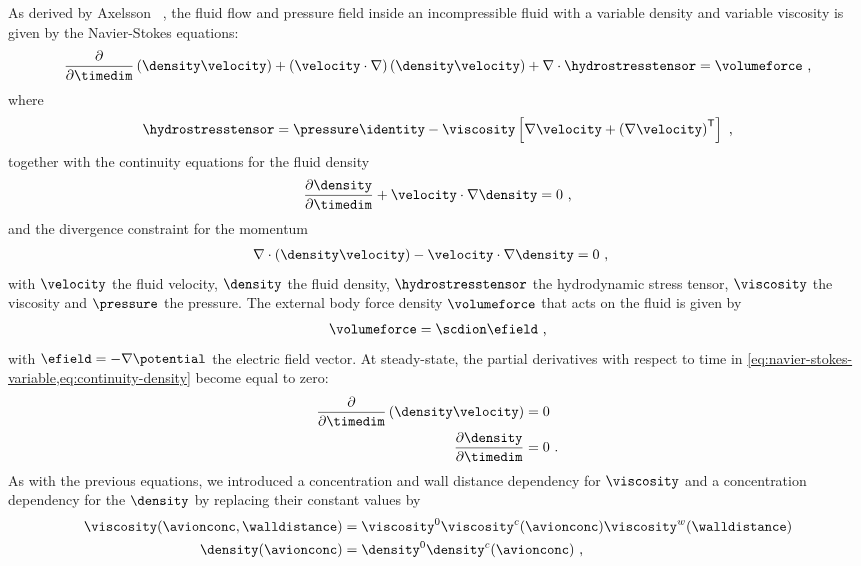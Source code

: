 As derived by Axelsson \etal{}~\cite{Axelsson-2015}, the fluid flow and pressure field inside an
incompressible fluid with a variable density and variable viscosity is given by the Navier-Stokes equations:
%
\begin{align}
  \label{eq:navier-stokes-variable}
  \dfrac{\partial}{\partial \timedim} \left( \density \velocity \right) +
  \left( \velocity \cdot \nabla \right) \left( \density\velocity \right)
  + \nabla \cdot \hydrostresstensor = \volumeforce
  \text{ ,}
\end{align}
%
where
%
\begin{align}
  \hydrostresstensor =
  \pressure\identity - \viscosity\left[\nabla\velocity+\left(\nabla\velocity \right)^\mathsf{T}\right]
  \text{ ,}
\end{align}
%
together with the continuity equations for the fluid density
%
\begin{align}
  \label{eq:continuity-density}
  \dfrac{\partial \density}{\partial \timedim} + \velocity \cdot \nabla \density  = 0
  \text{ ,}
\end{align}
%
and the divergence constraint for the momentum
%
\begin{align}
  \nabla \cdot \left( \density\velocity \right) - \velocity \cdot \nabla \density ={}& 0
  \text{ ,}
\end{align}
%
with $\velocity$ the fluid velocity, $\density$ the fluid density, $\hydrostresstensor$ the hydrodynamic
stress tensor, $\viscosity$ the viscosity and $\pressure$ the pressure. The external body force density
$\volumeforce$ that acts on the fluid is given by
%
\begin{align}\label{eq:ion_force_density}
  \volumeforce = \scdion \efield
  \text{ ,}
\end{align}
%
with $\efield = - \nabla \potential$ the electric field vector. At steady-state, the partial derivatives with
respect to time in \cref{eq:navier-stokes-variable,eq:continuity-density} become equal to zero:
%
\begin{align}
  \dfrac{\partial}{\partial \timedim} \left( \density \velocity \right) ={}& 0 \\
  \dfrac{\partial \density}{\partial \timedim} ={}& 0
  \text{ .}
\end{align}
%
As with the previous equations, we introduced a concentration and wall distance dependency for $\viscosity$
and a concentration dependency for the $\density$ by replacing their constant values by
%
\begin{align}\label{eq:epnp-ns_viscosity_density}
  \viscosity(\avionconc,\walldistance) ={}&
    \viscosity^0 \viscosity^c(\avionconc) \viscosity^w(\walldistance) \\
  \density(\avionconc) ={}&
    \density^0 \density^c(\avionconc)
  \text{ ,}
\end{align}
